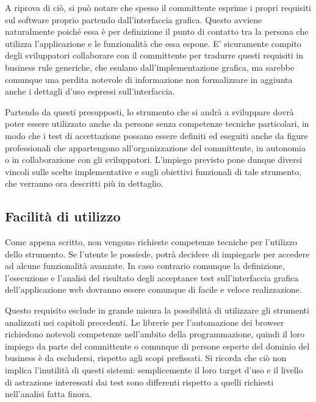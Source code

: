 A riprova di ciò, si può notare che spesso il committente esprime i propri requisiti sul software proprio partendo dall'interfaccia grafica. Questo avviene naturalmente poiché essa è per definizione il punto di contatto tra la persona che utilizza l'applicazione e le funzionalità che essa espone. E' sicuramente compito degli sviluppatori collaborare con il committente per tradurre questi requisiti in business rule generiche, che esulano dall'implementazione grafica, ma sarebbe comunque una perdita notevole di informazione non formalizzare in aggiunta anche i dettagli d'uso espressi sull'interfaccia.

Partendo da questi presupposti, lo strumento che si andrà a sviluppare dovrà poter essere utilizzato anche da persone senza competenze tecniche particolari, in modo che i test di accettazione possano essere definiti ed eseguiti anche da figure professionali che appartengono all'organizzazione del committente, in autonomia o in collaborazione con gli sviluppatori. L'impiego previsto pone dunque diversi vincoli sulle scelte implementative e sugli obiettivi funzionali di tale strumento, che verranno ora descritti più in dettaglio.

\subsection{Facilità di utilizzo}

Come appena scritto, non vengono richieste competenze tecniche per l'utilizzo dello strumento. Se l'utente le possiede, potrà decidere di impiegarle per accedere ad alcune funzionalità avanzate. In caso contrario comunque la definizione, l'esecuzione e l'analisi del risultato degli acceptance test sull'interfaccia grafica dell'applicazione web dovranno essere comunque di facile e veloce realizzazione. 

Questo requisito esclude in grande misura la possibilità di utilizzare gli strumenti analizzati nei capitoli precedenti. Le librerie per l'automazione dei browser richiedono notevoli competenze nell'ambito della programmazione, quindi il loro impiego da parte del committente o comunque di persone esperte del dominio del business è da escludersi, rispetto agli scopi prefissati. Si ricorda che ciò non implica l'inutilità di questi sistemi: semplicemente il loro target d'uso e il livello di astrazione interessati dai test sono differenti rispetto a quelli richiesti nell'analisi fatta finora. 

